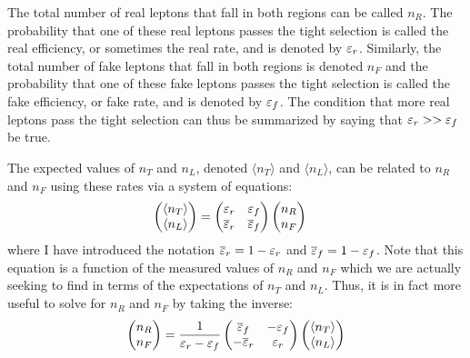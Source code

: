 The total number of real leptons that fall in 
both regions can be called $n_R$. The probability that one of these
real leptons passes the tight selection is called the 
real efficiency, or sometimes the real rate, and is denoted by 
$\varepsilon_r$. Similarly, the total number of fake leptons 
that fall in both regions is denoted $n_F$ and the probability 
that one of these fake leptons passes the tight selection is 
called the fake efficiency, or fake rate, and is 
denoted by $\varepsilon_f$. The condition that
more real leptons pass the tight selection can thus be summarized by saying
that $\varepsilon_r>>\varepsilon_f$ be true.

The expected values
of  $n_T$ and $n_L$,
denoted $\langle n_T\rangle$ and $\langle n_L\rangle$,
can be related to $n_R$ and $n_F$ using these rates via a system of
equations:
\begin{align}
  \label{eq:mxm_single}
  \begin{pmatrix} \langle n_T\rangle \\ \langle n_L\rangle \end{pmatrix} 
  &= 
  \begin{pmatrix}
  \varepsilon_r & \varepsilon_f \\ \overline{\varepsilon}_r & \overline{\varepsilon}_f
  \end{pmatrix} 
  \begin{pmatrix} n_R \\ n_F \end{pmatrix}
\end{align}
where I have introduced the notation $\overline{\varepsilon}_r = 1-\varepsilon_r$
and $\overline{\varepsilon}_f =1-\varepsilon_f$.
Note that this equation is a function of the measured values of
$n_R$ and $n_F$ which we are actually seeking to find in terms of the 
expectations of $n_T$ and $n_L$. Thus, it is in fact more
useful to solve for $n_R$ and $n_F$ by taking the inverse:
\begin{equation}
  \label{eq:mxm_single_inverted}
  \begin{pmatrix} n_R \\ n_F \end{pmatrix} 
  =
  \frac{1}{\varepsilon_r-\varepsilon_f}
  \begin{pmatrix}
  \overline{\varepsilon}_f & -\varepsilon_f \\ -\overline{\varepsilon}_r & \varepsilon_r
  \end{pmatrix} 
  \begin{pmatrix} \langle n_T\rangle \\ \langle n_L\rangle \end{pmatrix}
\end{equation}

